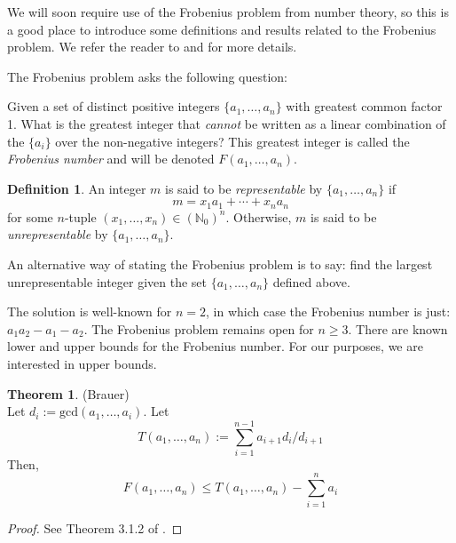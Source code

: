 \documentclass[11pt]{amsart}
\theoremstyle{definition}
\newtheorem{thm}{Theorem}[section]
\newtheorem*{defin}{Definition}
\begin{document}
{We will soon require use of the Frobenius problem from number theory, so this is a good place to introduce some definitions and results related to the Frobenius problem. We refer the reader to \cite{alf} and \cite{br} for more details.

The Frobenius problem asks the following question:

Given a set of distinct positive integers $\displaystyle \{a_1, \ldots, a_n\}$ with greatest common factor 1. What is the greatest integer that {\it cannot} be written as a linear combination of the $\{a_i\}$ over the non-negative integers? This greatest integer is called the {\it Frobenius number} and will be denoted $F(a_1, \ldots,a_n)$.

\begin{defin}
An integer $m$ is said to be {\it representable} by $\{a_1, \ldots, a_n\}$ if
\begin{equation*}
m = x_1a_1 + \cdots + x_na_n
\end{equation*}
for some $n$-tuple $\displaystyle (x_1, \ldots, x_n)\in({\mathbb N_0})^{n}$. Otherwise, $m$ is said to be {\it unrepresentable} by $\displaystyle \{a_1, \ldots, a_n\}$.
\end{defin}

An alternative way of stating the Frobenius problem is to say: find the largest unrepresentable integer given the set $\displaystyle \{a_1, \ldots, a_n\}$ defined above.

The solution is well-known for $n=2$, in which case the Frobenius number is just: $a_1a_2 - a_1 - a_2$. The Frobenius problem remains open for $n\geq3$. There are known lower and upper bounds for the Frobenius number. For our purposes, we are interested in upper bounds.

\begin{thm} \label{frobbound} (Brauer)
\\
Let $d_i:=\text{gcd}(a_1,\ldots,a_i)$. Let
\begin{equation*}
T(a_1,\ldots,a_n):=\sum_{i=1}^{n-1} a_{i+1}d_i / d_{i+1}
\end{equation*}
Then,
\begin{equation*}
F(a_1,\ldots,a_n) \leq T(a_1,\ldots,a_n) - \sum_{i=1}^{n} a_i
\end{equation*}
\end{thm}

\begin{proof}
See Theorem 3.1.2 of \cite{alf}.
\end{proof}

}
\end{document}
